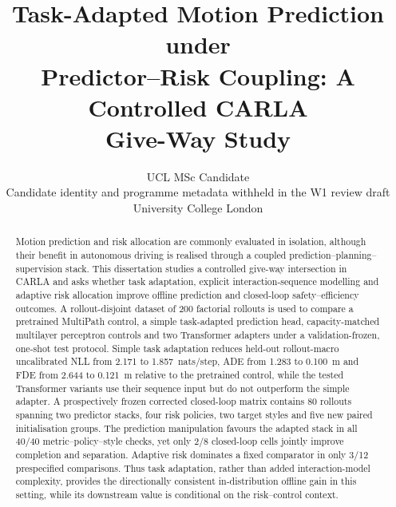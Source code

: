 \documentclass[10pt]{article}
\title{Task-Adapted Motion Prediction under\\
Predictor--Risk Coupling: A Controlled CARLA\\
Give-Way Study}
\author{\name UCL MSc Candidate \\
  \addr Candidate identity and programme metadata withheld in the W1 review draft \\
  University College London}
\begin{document}
\maketitle

\begin{abstract}
Motion prediction and risk allocation are commonly evaluated in isolation,
although their benefit in autonomous driving is realised through a coupled
prediction--planning--supervision stack. This dissertation studies a
controlled give-way intersection in CARLA and asks whether task adaptation,
explicit interaction-sequence modelling and adaptive risk allocation improve
offline prediction and closed-loop safety--efficiency outcomes. A
rollout-disjoint dataset of 200 factorial rollouts is used to compare a
pretrained MultiPath control, a simple task-adapted prediction head,
capacity-matched multilayer perceptron controls and two Transformer adapters
under a validation-frozen, one-shot test protocol. Simple task adaptation
reduces held-out rollout-macro uncalibrated NLL from 2.171 to
1.857~nats/step, ADE from 1.283 to 0.100~m and FDE from 2.644 to 0.121~m
relative to the pretrained control, while the tested
Transformer variants use their sequence input but do not outperform the
simple adapter. A prospectively frozen corrected closed-loop matrix contains
80 rollouts spanning two predictor stacks, four risk policies, two target
styles and five new paired initialisation groups. The prediction manipulation
favours the adapted stack in all 40/40 metric--policy--style checks, yet only
2/8 closed-loop cells jointly improve completion and separation. Adaptive
risk dominates a fixed comparator in only 3/12 prespecified comparisons.
Thus task adaptation, rather than added interaction-model complexity, provides
the directionally consistent in-distribution offline gain in this setting,
while its downstream value is conditional on the risk--control context.
\end{abstract}
\end{document}
